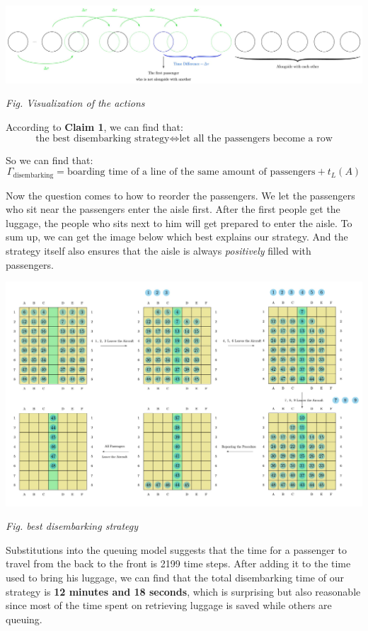 \documentclass{article}
\theoremstyle{definition}
\theoremstyle{remark}
\numberwithin{equation}{section}
\begin{document}
	\begin{center}
		\includegraphics[width = 14cm]{display of Delta tau.jpg}

		\small\textit{Fig. Visualization of the actions}
	\end{center}

	According to \textbf{Claim 1}, we can find that:
	$$\text{the best disembarking strategy}\Leftrightarrow
	\text{let all the passengers become a row}$$

	So we can find that:
	$$\Gamma_\text{disembarking}=\text{boarding time of a line of the same amount of passengers}+t_L(A)$$

	Now the question comes to how to reorder the passengers. We let the passengers who sit near the passengers enter the aisle first. After the first people get the luggage, the people who sits next to him will get prepared to enter the aisle. To sum up, we can get the image below which best explains our strategy. And the strategy itself also ensures that the aisle is always \textit{positively} filled with passengers.

	\begin{center}
		\includegraphics[width=15cm]{disembarking.jpg}

		\small \textit{Fig. best disembarking strategy}
	\end{center}

	Substitutions into the queuing model suggests that the time for a passenger to travel from the back to the front is 2199 time steps. After adding it to the time used to bring his luggage, we can find that the total disembarking time of our strategy is \textbf{12 minutes and 18 seconds}, which is surprising but also reasonable since most of the time spent on retrieving luggage is saved while others are queuing.
\end{document}
